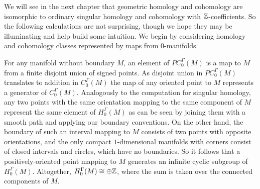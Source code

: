 \begin{example}\label{E: first examples}
	We will see in the next chapter that geometric homology and cohomology are isomorphic to ordinary singular homology and cohomology with $\mathbb{Z}$-coefficients.
	So the following calculations are not surprising, though we hope they may be illuminating and help build some intuition.
	We begin by considering homology and cohomology classes represented by maps from $0$-manifolds.

	For any manifold without boundary $M$, an element of $PC_0^\Gamma(M)$ is a map to $M$ from a finite disjoint union of signed points.
	As disjoint union in $PC_0^\Gamma(M)$ translates to addition in $C_0^\Gamma(M)$ the map of any oriented point to $M$ represents a generator of $C_0^\Gamma(M)$.
	Analogously to the computation for singular homology, any two points with the same orientation mapping to the same component of $M$ represent the same element of $H_0^\Gamma(M)$ as can be seen by joining them with a smooth path and applying our boundary conventions.
	On the other hand, the boundary of such an interval mapping to $M$ consists of two points with opposite orientations, and the only compact $1$-dimensional manifolds with corners consist of closed intervals and circles, which have no boundaries.
	So it follows that a positively-oriented point mapping to $M$ generates an infinite cyclic subgroup of $H_0^\Gamma(M)$.
	Altogether, $H_0^\Gamma(M) \cong \oplus \mathbb{Z}$, where the sum is taken over the connected components of $M$.


\end{example}
